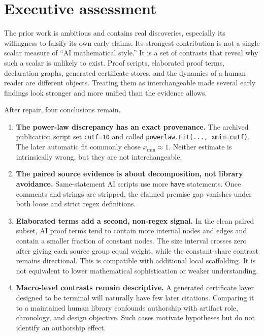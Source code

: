 \documentclass[11pt]{article}
\newcommand{\code}[1]{\texttt{#1}}
\newcommand{\xmin}{x_{\min}}
\begin{document}
\section{Executive assessment}

The prior work is ambitious and contains real discoveries, especially its willingness to
falsify its own early claims.  Its strongest contribution is not a single scalar measure of
``AI mathematical style.''  It is a set of contrasts that reveal why such a scalar is unlikely
to exist.  Proof scripts, elaborated proof terms, declaration graphs, generated certificate
stores, and the dynamics of a human reader are different objects.  Treating them as
interchangeable made several early findings look stronger and more unified than the evidence
allows.

After repair, four conclusions remain.

\begin{enumerate}[leftmargin=*,itemsep=.35em]
  \item \textbf{The power-law discrepancy has an exact provenance.}  The archived publication
  script set \code{cutf=10} and called \code{powerlaw.Fit(..., xmin=cutf)}.  The later
  automatic fit commonly chose $\xmin\approx1$.  Neither estimate is intrinsically wrong, but
  they are not interchangeable.
  \item \textbf{The paired source evidence is about decomposition, not library avoidance.}
  Same-statement AI scripts use more \code{have} statements.  Once comments and strings are
  stripped, the claimed premise gap vanishes under both loose and strict regex definitions.
  \item \textbf{Elaborated terms add a second, non-regex signal.}  In the clean paired subset,
  AI proof terms tend to contain more internal nodes and edges and contain a smaller fraction of
  constant nodes.  The size interval crosses zero after giving each source group equal weight,
  while the constant-share contrast remains directional.  This is compatible with additional
  local scaffolding.  It is not equivalent to
  lower mathematical sophistication or weaker understanding.
  \item \textbf{Macro-level contrasts remain descriptive.}  A generated certificate layer
  designed to be terminal will naturally have few later citations.  Comparing it to a
  maintained human library confounds authorship with artifact role, chronology, and design
  objective.  Such cases motivate hypotheses but do not identify an authorship effect.
\end{enumerate}
\end{document}
